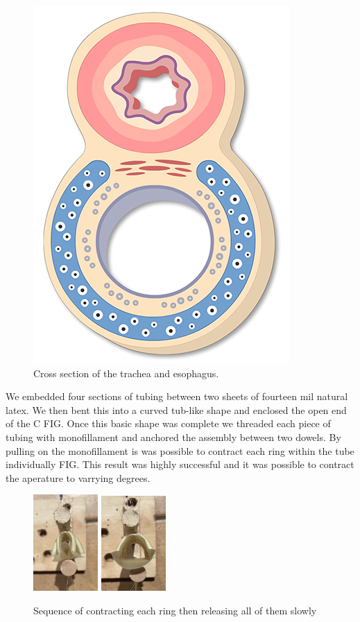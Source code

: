 \documentclass[letterpaper]{article}
\begin{document}
\begin{figure}[h]
\centering
\includegraphics[scale=0.3]{images/trachea.png}
\caption{Cross section of the trachea and esophagus.}
\end{figure}


We embedded four sections of tubing between two sheets of fourteen mil natural latex. We then bent this into a curved tub-like shape and enclosed the open end of the C FIG. Once this basic shape was complete we threaded each piece of tubing with monofillament and anchored the assembly between two dowels. By pulling on the monofillament is was possible to contract each ring within the tube individually FIG. This result was highly successful and it was possible to contract the aperature to varrying degrees.

\begin{figure}[h]
\centering
\includegraphics[width=0.22\textwidth]{images/46.JPG}
\includegraphics[width=0.22\textwidth]{images/52.JPG}
\caption{Sequence of contracting each ring then releasing all of them slowly}
\end{figure}
\end{document}
